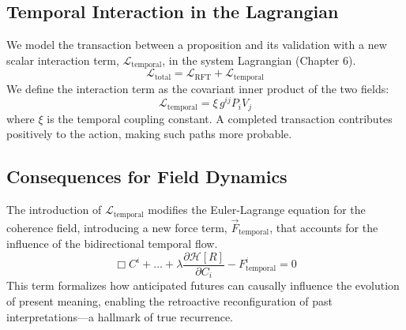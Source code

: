 
\subsection{Temporal Interaction in the Lagrangian}
We model the transaction between a proposition and its validation with a new scalar interaction term, \(\mathcal{L}_{\text{temporal}}\), in the system Lagrangian (Chapter 6).
\begin{equation}
\mathcal{L}_{\text{total}} = \mathcal{L}_{\text{RFT}} + \mathcal{L}_{\text{temporal}}
\end{equation}
We define the interaction term as the covariant inner product of the two fields:
\begin{equation}
\mathcal{L}_{\text{temporal}} = \xi \, g^{ij} P_{i} V_{j}
\end{equation}
where \(\xi\) is the temporal coupling constant. A completed transaction contributes positively to the action, making such paths more probable.


\subsection{Consequences for Field Dynamics}
The introduction of \(\mathcal{L}_{\text{temporal}}\) modifies the Euler-Lagrange equation for the coherence field, introducing a new force term, \(\vec{F}_{\text{temporal}}\), that accounts for the influence of the bidirectional temporal flow.
\begin{equation}
\Box C^i + \dots + \lambda \frac{\partial \mathcal{H}[R]}{\partial C_i} - F^i_{\text{temporal}} = 0
\end{equation}
This term formalizes how anticipated futures can causally influence the evolution of present meaning, enabling the retroactive reconfiguration of past interpretations—a hallmark of true recurrence. 